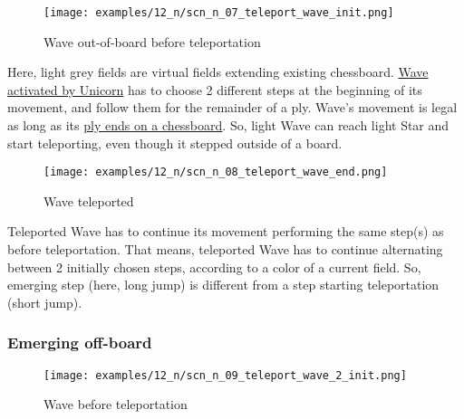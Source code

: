 \vspace*{-1.3\baselineskip}
\noindent
\begin{figure}[!h]
\texttt{[image: examples/12\_n/scn\_n\_07\_teleport\_wave\_init.png]}
\caption{Wave out-of-board before teleportation}
\label{fig:scn_n_07_teleport_wave_init}
\end{figure}

Here, light grey fields are virtual fields extending existing chessboard.
\hyperref[fig:scn_mv_031_wave_activation_by_unicorn_first_step]{Wave activated by Unicorn}
has to choose 2 different steps at the beginning of its movement, and follow
them for the remainder of a ply. Wave's movement is legal as long as its
\hyperref[fig:scn_mv_034_wave_off_board]{ply ends on a chessboard}. So, light
Wave can reach light Star and start teleporting, even though it stepped
outside of a board.

\clearpage %

\vspace*{-2.0\baselineskip}
\noindent
\begin{figure}[!h]
\texttt{[image: examples/12\_n/scn\_n\_08\_teleport\_wave\_end.png]}
\caption{Wave teleported}
\label{fig:scn_n_08_teleport_wave_end}
\end{figure}

Teleported Wave has to continue its movement performing the same step(s) as
before teleportation. That means, teleported Wave has to continue alternating
between 2 initially chosen steps, according to a color of a current field. So,
emerging step (here, long jump) is different from a step starting teleportation
(short jump).

\clearpage %

\subsubsection*{Emerging off-board}
\label{sec:Nineteen/Star/Teleporting pieces/Emerging off-board}

\vspace*{-1.0\baselineskip}
\noindent
\begin{figure}[!h]
\texttt{[image: examples/12\_n/scn\_n\_09\_teleport\_wave\_2\_init.png]}
\caption{Wave before teleportation}
\label{fig:scn_n_09_teleport_wave_2_init}
\end{figure}

